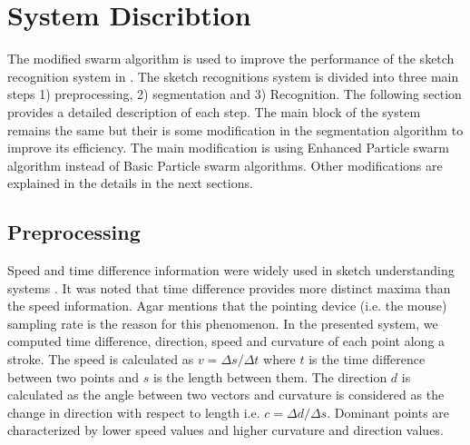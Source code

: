 \documentclass[10pt]{article}
\begin{document}



\section{System Discribtion  }\label{Sysdisc}
The modified swarm algorithm is used to improve the performance of the sketch recognition system in \cite{mypaper}. The sketch recognitions system is divided into three main steps 1) preprocessing, 2) segmentation and 3) Recognition. The following section provides a detailed description of each step. The main block of the system remains the same but their is some modification in the segmentation algorithm to improve its efficiency. The main modification is using Enhanced Particle swarm algorithm instead of Basic Particle swarm algorithms. Other modifications are explained in the details in the next sections.  
\subsection{Preprocessing}
\label{Prepross}
 Speed and time difference information were widely used in sketch understanding systems \cite{earlyprocess}. It was noted that time difference provides more distinct maxima than the speed information. Agar \cite{polygonfeedback31} mentions that the pointing device (i.e. the mouse) sampling rate is the reason for this phenomenon. 
 In the presented system, we computed time difference, direction, speed and curvature of each point along a stroke. The speed is calculated as $v=\Delta s/\Delta t$ where $t$ is the time difference between two points and $s$ is the length between them. The direction $d$ is calculated as the angle between two vectors and curvature is considered as the change in direction with respect to length i.e. $c= \Delta d/\Delta s$. Dominant points are characterized by lower speed values and higher curvature and direction values.
  
\end{document}

